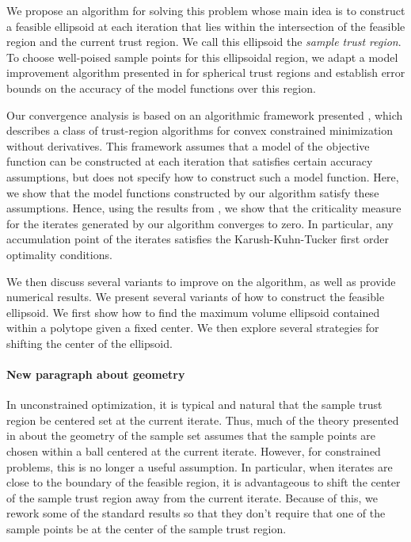 \documentclass{article}
\begin{document}
We propose an algorithm for solving this problem whose main idea is to construct a feasible ellipsoid at each iteration that lies within the intersection of the feasible region and the current trust region.   We call this ellipsoid the {\em sample trust region}.
To choose well-poised sample points for this ellipsoidal region,  we adapt a model improvement algorithm presented in \cite{introduction_book} for spherical trust regions and establish error bounds on the accuracy of the model functions over this region.    

Our convergence analysis is based on an algorithmic framework presented \cite{Conejo:2013:GCT:2620806.2621814},  which describes a class of trust-region algorithms for convex constrained minimization without derivatives.   This framework assumes that a model of the objective function can be constructed at each iteration that satisfies certain accuracy assumptions, but does not specify how to construct such a model function.    Here, we show that the model functions constructed by our algorithm satisfy these assumptions.  Hence,  using the results from \cite{Conejo:2013:GCT:2620806.2621814}, we show that
the criticality measure for the iterates generated by our algorithm converges to zero.  In particular, any accumulation point of the iterates satisfies the Karush-Kuhn-Tucker first order optimality conditions.  




 

We then discuss several variants to improve on the algorithm, as well as provide numerical results.
 We present several variants of how to construct the feasible ellipsoid.
 We first show how to find the maximum volume ellipsoid contained within a polytope given a fixed center.
 We then explore several strategies for shifting the center of the ellipsoid.    
 

\paragraph{New paragraph about geometry}  In unconstrained optimization, it is typical and natural that the sample trust region be centered set at the current iterate.   Thus, much of the theory presented  
 in \cite{introduction_book} about the geometry of the sample set assumes that the sample points are chosen within a ball centered at the current iterate.  However, for constrained problems,  this is no longer a useful assumption.   In particular, when iterates are close to the boundary of the feasible region, it is advantageous to shift the center of the sample trust region away from the current iterate.     Because of this, we rework some of the standard results so that they don't require that one of the sample points be at the center of the sample trust region.
\end{document}
